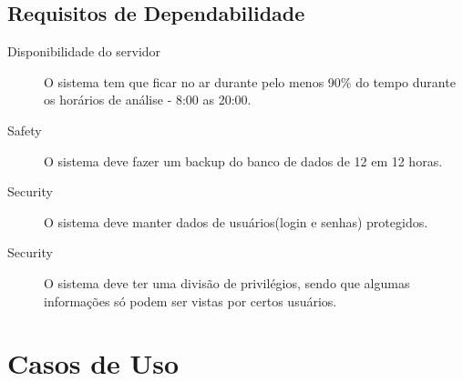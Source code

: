 \section{Requisitos de Dependabilidade}
\begin{description}
    \item[Disponibilidade do servidor] O sistema tem que ficar no ar
    durante pelo menos 90\% do tempo durante os horários de análise -
    8:00 as 20:00.
    \item[Safety] O sistema deve fazer um backup do banco de dados de
    12 em 12 horas.
    \item[Security] O sistema deve manter dados de usuários(login e
            senhas) protegidos.
    \item[Security] O sistema deve ter uma divisão de privilégios,
    sendo que algumas informações só podem ser vistas por certos
    usuários.
\end{description}
 


\chapter{Casos de Uso}

